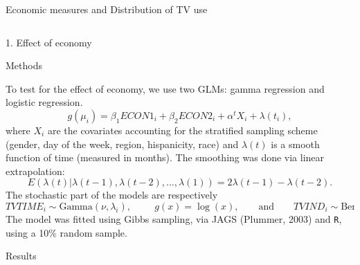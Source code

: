 \documentclass[final]{beamer}
\newcounter{acolumn}%
\def\autoheight{\vspace*{0pt}}%
\begin{document}
\begin{frame}
\begin{acolumns}[t]
\begin{column}{.48\linewidth}
\begin{block}{Economic measures and Distribution of TV use}
                \autoheight
               \end{block}
               
             
               \end{column}
              
            \end{acolumns}
        
        
        \vfill
    
    \begin{acolumns}[t]
    
    \begin{column}{.72\linewidth}
    \begin{center}
   		\LARGE{1. Effect of economy}
    \end{center}
     \begin{block}{Methods}
       
       To test for the effect of economy, we use two GLMs: gamma regression and logistic regression.
       $$g(\mu_i)=\beta_1ECON1_i+\beta_2ECON2_i + \alpha^t X_i + \lambda(t_i),$$
       where $X_i$ are the covariates accounting for the stratified sampling scheme (gender, day of the week, region, hispanicity, race) and $\lambda(t)$ is a smooth function of time (measured in months). The smoothing was done via linear extrapolation:
       $$E\left(\lambda(t)|\lambda(t-1),\lambda(t-2),\ldots,\lambda(1)\right) = 2\lambda(t-1) - \lambda(t-2).$$
       The stochastic part of the models are respectively
       $$TVTIME_i\sim \mathrm{Gamma}(\nu, \lambda_i),\hspace{1cm} g(x)=\log(x),\qquad\mbox{and}\qquad TVIND_i\sim \mathrm{Bernouilli}(\pi_i), \hspace{1cm} g(x)=\mathrm{logit}(x).$$
       The model was fitted using Gibbs sampling, via JAGS (Plummer, 2003) and \texttt{R}, using a 10\% random sample.
        
     \end{block}
     
     
     \begin{block}{Results}
     

\end{block}
\end{column}
\end{acolumns}
\end{frame}
\end{document}
